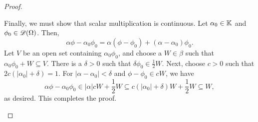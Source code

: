 \begin{proof}
\begin{enumerate}[label=(\alph*)]
    Finally, we must show that scalar multiplication is continuous. Let $\alpha_0\in\mathbb{K}$ and $\phi_0\in\mathscr{D}(\Omega)$. Then, 
    \begin{equation*}
        \alpha\phi - \alpha_0\phi_0 = \alpha(\phi - \phi_0) + (\alpha - \alpha_0)\phi_0.
    \end{equation*}
    Let $V$ be an open set containing $\alpha_0\phi_0$, and choose a $W\in\beta$ such that $\alpha_0\phi_0 + W\subseteq V$. There is a $\delta > 0$ such that $\delta\phi_0\in\frac{1}{2}W$. Next, choose $c > 0$ such that $2c(|\alpha_0| + \delta) = 1$. For $|\alpha - \alpha_0| < \delta$ and $\phi - \phi_0\in cW$, we have 
    \begin{equation*}
        \alpha\phi - \alpha_0\phi_0\in |\alpha|cW + \frac{1}{2}W\subseteq c(|\alpha_0| + \delta) W + \frac{1}{2}W\subseteq W,
    \end{equation*}
    as desired. This completes the proof.\qedhere
\end{enumerate}
\end{proof}

